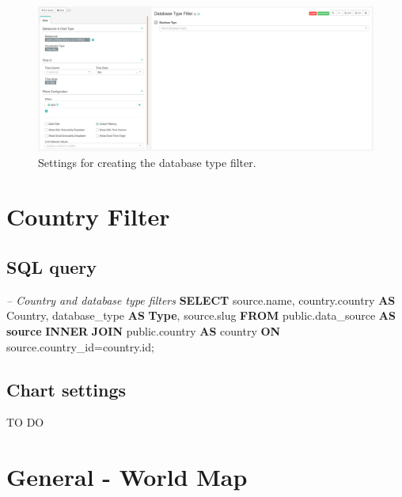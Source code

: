 \documentclass[]{book}
\newenvironment{Shaded}{\begin{snugshade}}{\end{snugshade}}
\newcommand{\KeywordTok}[1]{\textcolor[rgb]{0.13,0.29,0.53}{\textbf{#1}}}
\newcommand{\CommentTok}[1]{\textcolor[rgb]{0.56,0.35,0.01}{\textit{#1}}}
\newcommand{\NormalTok}[1]{#1}
\begin{document}
\begin{figure}
\includegraphics[width=1\linewidth]{images/databaseTypeFilter} \caption{Settings for creating the database type filter.}\label{fig:databaseTypeFilter}
\end{figure}

\section{Country Filter}\label{country-filter}

\subsection{SQL query}\label{sql-query-1}

\begin{Shaded}
\begin{Highlighting}[]
\CommentTok{--  Country and database type filters}
\KeywordTok{SELECT}\NormalTok{ source.name, }
\NormalTok{       country.country }\KeywordTok{AS}\NormalTok{ Country, }
\NormalTok{       database_type }\KeywordTok{AS} \KeywordTok{Type}\NormalTok{,}
\NormalTok{       source.slug}
\KeywordTok{FROM}\NormalTok{ public.data_source }\KeywordTok{AS} \KeywordTok{source} \KeywordTok{INNER} \KeywordTok{JOIN}\NormalTok{ public.country }
    \KeywordTok{AS}\NormalTok{ country }\KeywordTok{ON}\NormalTok{ source.country_id=country.id;}
\end{Highlighting}
\end{Shaded}

\subsection{Chart settings}\label{chart-settings-1}

TO DO

\section{General - World Map}\label{general---world-map}
\end{document}
